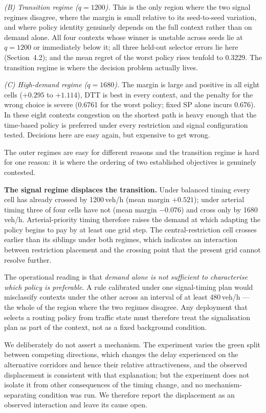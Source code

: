 \documentclass[10pt,a4paper]{article}
\begin{document}
\emph{(B) Transition regime ($q=1200$).} This is the only region where the two signal regimes disagree, where the margin is small relative to its seed-to-seed variation, and where policy identity genuinely depends on the full context rather than on demand alone. All four contexts whose winner is unstable across seeds lie at $q=1200$ or immediately below it; all three held-out selector errors lie here (Section~4.2); and the mean regret of the worst policy rises tenfold to 0.3229. The transition regime is where the decision problem actually lives.

\emph{(C) High-demand regime ($q=1680$).} The margin is large and positive in all eight cells ($+0.295$ to $+1.114$), DTT is best in every context, and the penalty for the wrong choice is severe (0.6761 for the worst policy; fixed SP alone incurs 0.676). In these eight contexts congestion on the shortest path is heavy enough that the time-based policy is preferred under every restriction and signal configuration tested. Decisions here are easy again, but expensive to get wrong.

The outer regimes are easy for different reasons and the transition regime is hard for one reason: it is where the ordering of two established objectives is genuinely contested.

\textbf{The signal regime displaces the transition.} Under balanced timing every cell has already crossed by 1200\,veh/h (mean margin $+0.521$); under arterial timing three of four cells have not (mean margin $-0.076$) and cross only by 1680\,veh/h. Arterial-priority timing therefore raises the demand at which adapting the policy begins to pay by at least one grid step. The central-restriction cell crosses earlier than its siblings under both regimes, which indicates an interaction between restriction placement and the crossing point that the present grid cannot resolve further.

The operational reading is that \emph{demand alone is not sufficient to characterise which policy is preferable}. A rule calibrated under one signal-timing plan would misclassify contexts under the other across an interval of at least 480\,veh/h --- the whole of the region where the two regimes disagree. Any deployment that selects a routing policy from traffic state must therefore treat the signalisation plan as part of the context, not as a fixed background condition.

We deliberately do not assert a mechanism. The experiment varies the green split between competing directions, which changes the delay experienced on the alternative corridors and hence their relative attractiveness, and the observed displacement is consistent with that explanation; but the experiment does not isolate it from other consequences of the timing change, and no mechanism-separating condition was run. We therefore report the displacement as an observed interaction and leave its cause open.
\end{document}
